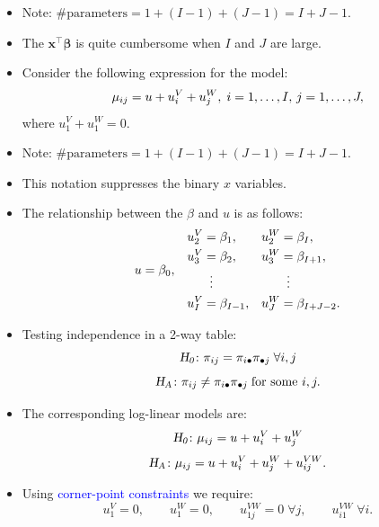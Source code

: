 \documentclass[oneside]{book}\usepackage[]{graphicx}\usepackage[svgnames]{xcolor}
\let\log\relax%
\newcommand{\HN}{\textsl{H}_{\textsl{0}}}%
\newcommand{\HA}{\textsl{H}_{\textsl{A}}}%
\providecommand{\Vector}[1]{\bm{#1}}%
\begin{document}
\begin{itemize}
      \item Note: $ \text{\# parameters}=1+(I-1)+(J-1)=I+J-1 $.
      \item The $ \Vector{x}^\top \Vector{\beta} $ is quite cumbersome when $ I $ and $ J $ are large.
      \item Consider the following expression for the model:
            \[ \log{\mu_{ij}}=u+u_i^V+u_j^W,\;i=1,\ldots,I,\,j=1,\ldots,J, \]
            where $ u_1^V+u_1^W=0 $.
      \item Note: $ \text{\# parameters}=1+(I-1)+(J-1)=I+J-1 $.
      \item This notation suppresses the binary $ x $ variables.
      \item The relationship between the $ \beta $ and $ u $ is as follows:
            \[ \begin{array}{ccc}
                        u=\beta_0,                 &
                        \begin{aligned}
                              u_2^V & =\beta_1,       \\
                              u_3^V & =\beta_2,       \\
                                    & \vdotswithin{=} \\
                              u_I^V & =\beta_{I-1},
                        \end{aligned} &
                        \begin{aligned}
                              u_2^W & =\beta_I,       \\
                              u_3^W & =\beta_{I+1},   \\
                                    & \vdotswithin{=} \\
                              u_J^W & =\beta_{I+J-2}.
                        \end{aligned}
                  \end{array} \]
      \item Testing independence in a 2-way table:
            \[ \HN\colon \pi_{ij}=\pi_{i\bullet}\pi_{\bullet j}\;\forall i,j \]
            \[ \HA\colon \pi_{ij}\ne \pi_{i\bullet}\pi_{\bullet j}\;\text{for some } i,j. \]
      \item The corresponding log-linear models are:
            \[ \HN\colon \log{\mu_{ij}}=u+u_i^V+u_j^W \]
            \[ \HA\colon\log{\mu_{ij}}=u+u_i^V+u_j^W+u_{ij}^{VW}. \]
      \item Using \textcolor{Blue}{corner-point constraints} we require:
            \[ u_1^V=0,\qquad u_1^W=0,\qquad u_{1j}^{VW}=0\;\forall j,\qquad u_{i1}^{VW}\;\forall i. \]

\end{itemize}
\end{document}
